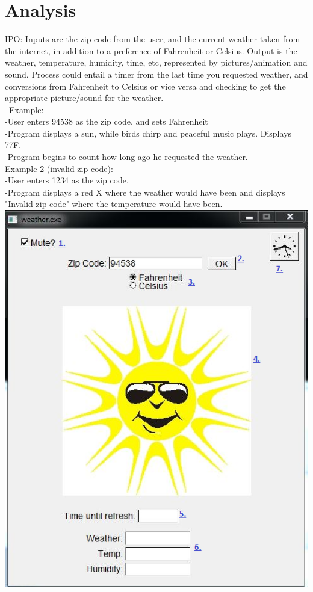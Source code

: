 \documentclass{article}
\begin{document}
\section{Analysis}
IPO: Inputs are the zip code from the user, and the current weather taken from the internet, in addition to a preference of Fahrenheit or Celsius. Output is the weather, temperature, humidity, time, etc, represented by pictures/animation and sound. Process could entail a timer from the last time you requested weather, and conversions from Fahrenheit to Celsius or vice versa and checking to get the appropriate picture/sound for the weather.\\\
Example:\\
-User enters 94538 as the zip code, and sets Fahrenheit\\
-Program displays a sun, while birds chirp and peaceful music plays. Displays 77F.\\
-Program begins to count how long ago he requested the weather.\\
Example 2 (invalid zip code):\\
-User enters 1234 as the zip code.\\
-Program displays a red X where the weather would have been and displays "Invalid zip code" where the temperature would have been.\\
\includegraphics[bb=0 0 480 600]{GUIwip.eps}
\end{document}
